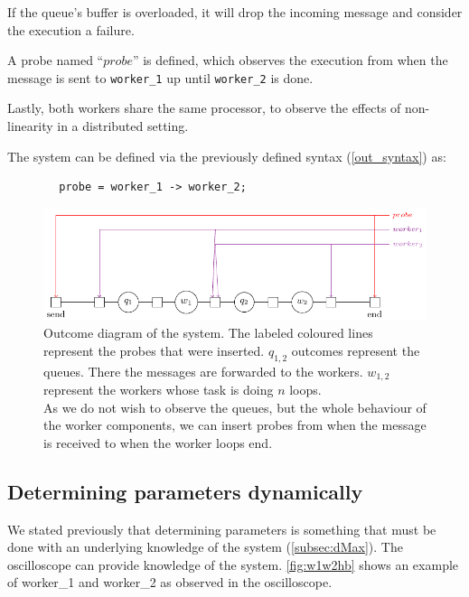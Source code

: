     If the queue's buffer is overloaded, it will drop the incoming message and consider the execution a failure.
    
    A probe named ``$probe$'' is defined, which observes the execution from when the message is sent to \texttt{worker\_1} up until \texttt{worker\_2} is done.

    Lastly, both workers share the same processor, to observe the effects of non-linearity in a distributed setting.

    The system can be defined via the previously defined syntax (\cref{out_syntax}) as: 
    
    \begin{verbatim}
        probe = worker_1 -> worker_2;
    \end{verbatim}

    \begin{figure}[H]
        \begin{center}
            \includegraphics[scale=1.2, width=\textwidth]{tikz/mm1k.pdf} 
        \end{center}
        \caption{Outcome diagram of the system. The labeled coloured lines represent the probes that were inserted. $q_{1, 2}$ outcomes represent the queues. There the messages are forwarded to the workers. $w_{1,2}$ represent the workers whose task is doing $n$ loops. \\
        As we do not wish to observe the queues, but the whole behaviour of the worker components, we can insert probes from when the message is received to when the worker loops end.}
        \label{fig:mm1k}
    \end{figure}

    \subsection{Determining parameters dynamically}
        We stated previously that determining parameters is something that must be done with an underlying knowledge of the system (\cref{subsec:dMax}). The oscilloscope can provide knowledge of the system. \cref{fig:w1w2hb} shows an example of worker\_1 and worker\_2 as observed in the oscilloscope.

